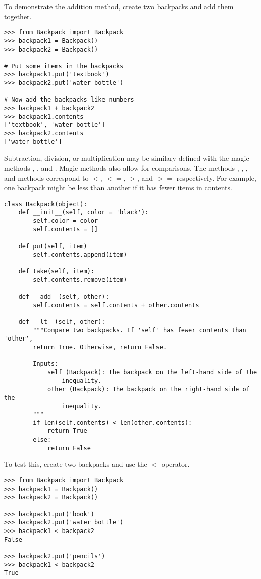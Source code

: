 To demonstrate the addition method, create two backpacks and add them together.

\begin{lstlisting}
>>> from Backpack import Backpack
>>> backpack1 = Backpack()
>>> backpack2 = Backpack()

# Put some items in the backpacks
>>> backpack1.put('textbook')
>>> backpack2.put('water bottle')

# Now add the backpacks like numbers
>>> backpack1 + backpack2
>>> backpack1.contents
['textbook', 'water bottle']
>>> backpack2.contents
['water bottle']
\end{lstlisting}

Subtraction, division, or multiplication may be similary defined with the magic methods , , and .
Magic methods also allow for comparisons.
The methods , , , and  methods correspond to $<$, $<=$, $>$, and $>=$ respectively.
For example, one backpack might be less than another if it has fewer items in contents.

\begin{lstlisting}
class Backpack(object):
    def __init__(self, color = 'black'):
        self.color = color
        self.contents = []
    
    def put(self, item)
        self.contents.append(item)
    
    def take(self, item):
        self.contents.remove(item)

    def __add__(self, other):
        self.contents = self.contents + other.contents

    def __lt__(self, other):
        """Compare two backpacks. If 'self' has fewer contents than 'other',
        return True. Otherwise, return False.
        
        Inputs:
            self (Backpack): the backpack on the left-hand side of the
                inequality.
            other (Backpack): The backpack on the right-hand side of the
                inequality.
        """
        if len(self.contents) < len(other.contents):
            return True
        else:
            return False
\end{lstlisting}

To test this, create two backpacks and use the $<$ operator.
\begin{lstlisting}
>>> from Backpack import Backpack
>>> backpack1 = Backpack()
>>> backpack2 = Backpack()

>>> backpack1.put('book')
>>> backpack2.put('water bottle')
>>> backpack1 < backpack2
False

>>> backpack2.put('pencils')
>>> backpack1 < backpack2
True
\end{lstlisting}

